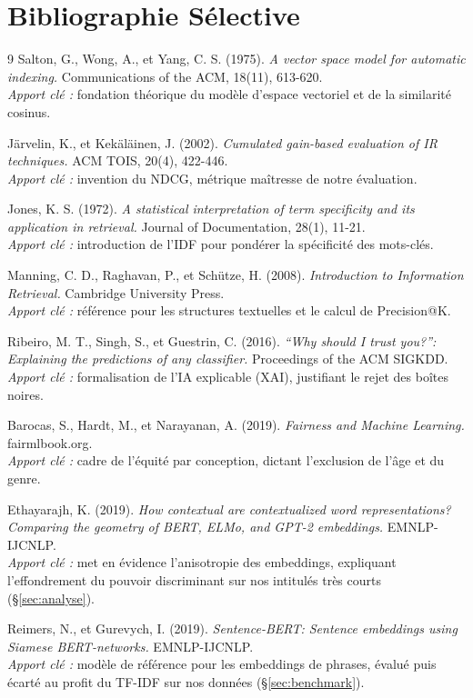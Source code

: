 \documentclass[11pt,a4paper]{article}
\begin{document}
\section{Bibliographie Sélective}
\begin{thebibliography}{9}
 Salton, G., Wong, A., et Yang, C. S. (1975). \emph{A vector space model for
automatic indexing.} Communications of the ACM, 18(11), 613-620. \\
\textit{Apport clé :} fondation théorique du modèle d'espace vectoriel et de la similarité cosinus.

 Järvelin, K., et Kekäläinen, J. (2002). \emph{Cumulated gain-based evaluation of
IR techniques.} ACM TOIS, 20(4), 422-446. \\
\textit{Apport clé :} invention du NDCG, métrique maîtresse de notre évaluation.

 Jones, K. S. (1972). \emph{A statistical interpretation of term specificity and its
application in retrieval.} Journal of Documentation, 28(1), 11-21. \\
\textit{Apport clé :} introduction de l'IDF pour pondérer la spécificité des mots-clés.

 Manning, C. D., Raghavan, P., et Schütze, H. (2008). \emph{Introduction to
Information Retrieval.} Cambridge University Press. \\
\textit{Apport clé :} référence pour les structures textuelles et le calcul de Precision@K.

 Ribeiro, M. T., Singh, S., et Guestrin, C. (2016). \emph{``Why should I trust
you?'': Explaining the predictions of any classifier.} Proceedings of the ACM SIGKDD. \\
\textit{Apport clé :} formalisation de l'IA explicable (XAI), justifiant le rejet des boîtes noires.

 Barocas, S., Hardt, M., et Narayanan, A. (2019). \emph{Fairness and Machine
Learning.} fairmlbook.org. \\
\textit{Apport clé :} cadre de l'équité par conception, dictant l'exclusion de l'âge et du genre.

 Ethayarajh, K. (2019). \emph{How contextual are contextualized word
representations? Comparing the geometry of BERT, ELMo, and GPT-2 embeddings.} EMNLP-IJCNLP. \\
\textit{Apport clé :} met en évidence l'anisotropie des embeddings, expliquant l'effondrement du
pouvoir discriminant sur nos intitulés très courts (\S\ref{sec:analyse}).

 Reimers, N., et Gurevych, I. (2019). \emph{Sentence-BERT: Sentence embeddings using
Siamese BERT-networks.} EMNLP-IJCNLP. \\
\textit{Apport clé :} modèle de référence pour les embeddings de phrases, évalué puis écarté au
profit du TF-IDF sur nos données (\S\ref{sec:benchmark}).
\end{thebibliography}
\end{document}
